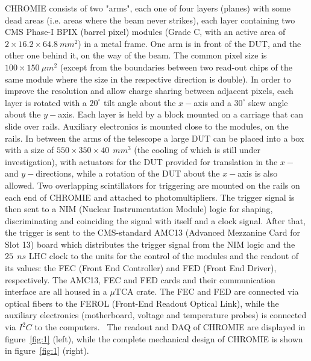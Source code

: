\documentclass[a4paper,11pt]{article}
\begin{document}
CHROMIE consists of two "arms", each one of four layers (planes) with some dead areas (i.e. areas where the beam never strikes), each layer containing two CMS Phase-I BPIX (barrel pixel) modules (Grade C, with an active area of $2\times 16.2 \times 64.8\: mm^2$) in a metal frame. One arm is in front of the DUT, and the other one behind it, on the way of the beam. The common pixel size is $100\times 150\: \mu m^2$ (except from the boundaries between two read-out chips of the same module where the size in the respective direction is double). In order to improve the resolution and allow charge sharing between adjacent pixels, each layer is rotated with a $20^{\circ}$ tilt angle about the $x-$axis and a $30^{\circ}$ skew angle about the $y-$axis. Each layer is held by a block mounted on a carriage that can slide over rails. Auxiliary electronics is mounted close to the modules, on the rails. In between the arms of the telescope a large DUT can be placed into a box with a size of $550 \times 350 \times 40\: \: mm^3$ (the cooling of which is still under investigation), with actuators for the DUT provided for translation in the $x-$ and $y-$directions, while a rotation of the DUT about the $x-$axis is also allowed. Two overlapping scintillators for triggering are mounted on the rails on each end of CHROMIE and attached to photomultipliers. The trigger signal is then sent to a NIM (Nuclear Instrumentation Module) logic for shaping, discriminating and coinciding the signal with itself and a clock signal. After that, the trigger is sent to the CMS-standard AMC13 (Advanced Mezzanine Card for Slot 13) board which distributes the trigger signal from the NIM logic and the $25\: \: ns$ LHC clock to the units for the control of the modules and the readout of its values: the FEC (Front End Controller) and FED (Front End Driver), respectively. The AMC13, FEC and FED cards and their communication interface are all housed in a $\mu$TCA crate. The FEC and FED are connected via optical fibers to the FEROL (Front-End Readout Optical Link), while the auxiliary electronics (motherboard, voltage and temperature probes) is connected via $I^2 C$ to the computers.~\cite{d} The readout and DAQ of CHROMIE are displayed in figure~\ref{fig:1} (left), while the complete mechanical design of CHROMIE is shown in figure~\ref{fig:1} (right).
\end{document}
